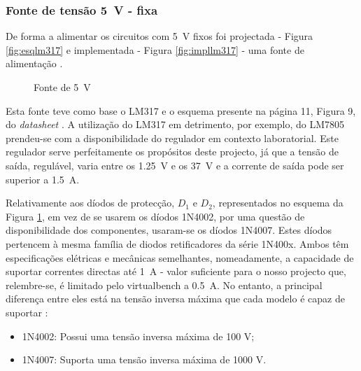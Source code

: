 \subsubsection{Fonte de tensão \SI{5}{\volt} - fixa}
De forma a alimentar os circuitos com \SI{5}{\volt} fixos foi projectada - Figura \ref{fig:esqlm317} e implementada - Figura \ref{fig:impllm317} - uma fonte de alimentação \cite{LM317}.

\begin{figure}[hbtp]
	\centering%
		\centering
		\qquad
		\caption{Fonte de \SI{5}{\volt} }%
		\label{fig:fonte5V}%
	\end{figure}

Esta fonte teve como base o LM317 e o esquema presente na página 11, Figura 9, do \textit{datasheet} \cite{LM317}. A utilização do LM317 em detrimento, por exemplo, do LM7805 prendeu-se com a disponibilidade do regulador em contexto laboratorial. Este regulador serve perfeitamente os propósitos deste projecto, já que a tensão de saída, regulável, varia entre os \SI{1.25}{\volt} e os \SI{37}{\volt} e a corrente de saída pode ser superior a \SI{1.5}{\ampere}. 

Relativamente aos díodos de protecção, $D_{1}$ e $D_{2}$, representados no esquema da Figura \ref{fig:fonte5V}, em vez de se usarem os díodos 1N4002, por uma questão de disponibilidade dos componentes, usaram-se os díodos 1N4007. Estes díodos pertencem à mesma família de diodos retificadores da série 1N400x. Ambos têm especificações elétricas e mecânicas semelhantes, nomeadamente, a capacidade de suportar correntes directas até \SI{1}{\ampere} - valor suficiente para o nosso projecto que, relembre-se, é limitado pelo \acrshort{virtualbench} a \SI{0.5}{\ampere}. No entanto, a principal diferença entre eles está na tensão inversa máxima que cada modelo é capaz de suportar \cite{1N400x}:

\begin{itemize}
	\item 1N4002: Possui uma tensão inversa máxima de 100 V;
	\item 1N4007: Suporta uma tensão inversa máxima de 1000 V.
\end{itemize}

